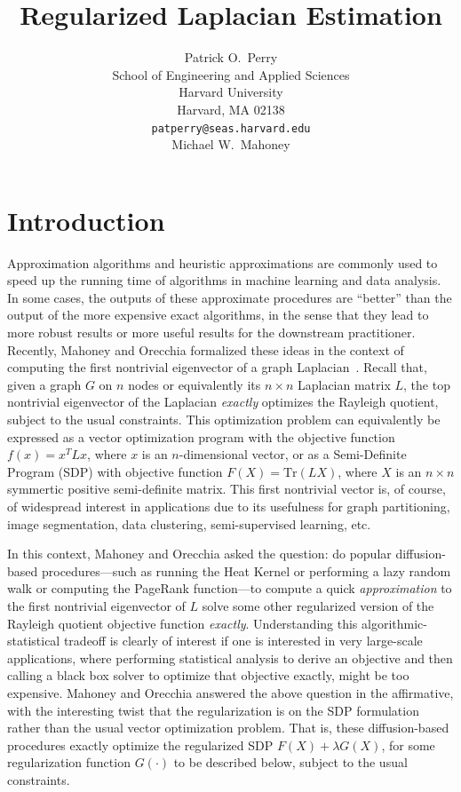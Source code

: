 \documentclass[12pt]{article}
\title{
  Regularized Laplacian Estimation
}
\author{
  Patrick O.~Perry \\
  School of Engineering and Applied Sciences \\
  Harvard University \\
  Harvard, MA 02138 \\
  \texttt{patperry@seas.harvard.edu} \\
  \And
  Michael W.\ Mahoney
}
\theoremstyle{plain}
\begin{document}
\maketitle

\begin{abstract}
\end{abstract}

\section{Introduction}
\label{sxn:intro}

Approximation algorithms and heuristic approximations are commonly used to
speed up the running time of algorithms in machine learning and data
analysis.
In some cases, the outputs of these approximate procedures are ``better''
than the output of the more expensive exact algorithms, in the sense that
they lead to more robust results or more useful results for the downstream
practitioner.
Recently, Mahoney and Orecchia formalized these ideas in the context of
computing the first nontrivial eigenvector of a graph
Laplacian~\cite{mahoney2010implementing}.
Recall that, given a graph $G$ on $n$ nodes or equivalently its $n \times n$
Laplacian matrix $L$, the top nontrivial eigenvector of the Laplacian
\emph{exactly} optimizes the Rayleigh quotient, subject to the usual
constraints.
This optimization problem can equivalently be expressed as a vector
optimization program with the objective function $f(x) = x^TLx$,
where $x$ is an $n$-dimensional vector, or as a Semi-Definite Program (SDP)
with objective function $F(X)=\mathrm{Tr}(L X)$, where $X$ is an $n \times n$
symmertic positive semi-definite matrix.
This first nontrivial vector is, of course, of widespread interest in
applications due to its usefulness for graph partitioning, image
segmentation, data clustering, semi-supervised learning, etc.

In this context, Mahoney and Orecchia asked the question: do popular
diffusion-based procedures---such as running the Heat Kernel or performing a
lazy random walk or computing the PageRank function---to compute a quick
\emph{approximation} to the first nontrivial eigenvector of $L$ solve some
other regularized version of the Rayleigh quotient objective function
\emph{exactly}.
Understanding this algorithmic-statistical tradeoff is clearly of interest
if one is interested in very large-scale applications, where performing
statistical analysis to derive an objective and then calling a black box
solver to optimize that objective exactly, might be too expensive.
Mahoney and Orecchia answered the above question in the affirmative, with
the interesting twist that the regularization is on the SDP formulation
rather than the usual vector optimization problem.
That is, these diffusion-based procedures exactly optimize the regularized
SDP $F(X)+\lambda G(X)$, for some regularization function $G(\cdot)$ to be
described below, subject to the usual constraints.
\end{document}
